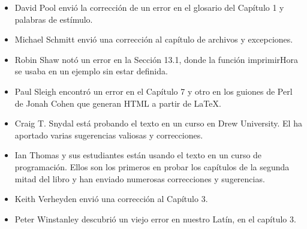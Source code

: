 \begin{itemize}
\item David Pool envió la corrección de un error en el glosario del Capítulo 1 y 
palabras de estímulo.


\item Michael Schmitt envió una corrección al capítulo de archivos y 
excepciones.


\item Robin Shaw notó un error en la Sección 13.1, donde la función
imprimirHora se usaba en un ejemplo sin estar definida.


\item Paul Sleigh encontró un error en el Capítulo 7 y otro en los
guiones de Perl de Jonah Cohen que generan HTML a partir de LaTeX.




\item Craig T. Snydal está probando el texto en un curso en  Drew
University. El ha aportado varias sugerencias valiosas y correcciones.



\item Ian Thomas y sus estudiantes están usando el texto en un curso
de programación. Ellos son los primeros en probar los capítulos de la
segunda mitad del libro y han enviado numerosas correcciones y 
sugerencias.


\item Keith Verheyden envió una corrección al Capítulo 3.


\item Peter Winstanley descubrió un viejo error en nuestro Latín,
en el capítulo 3.



\end{itemize}
